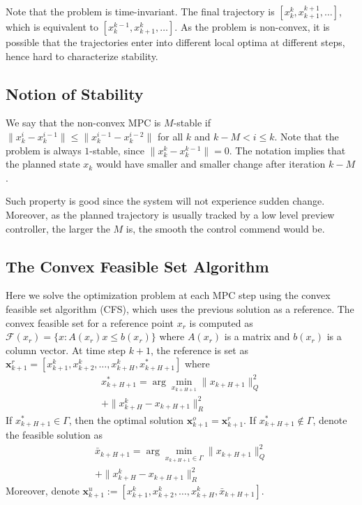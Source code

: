 \documentclass{ifacconf}
\begin{document}
Note that the problem is time-invariant. The final trajectory is $[x_k^k,x_{k+1}^{k+1},\ldots]$, which is equivalent to $[x_{k}^{k-1},x_{k+1}^{k},\ldots]$. As the problem is non-convex, it is possible that the trajectories enter into different local optima at different steps, hence hard to characterize stability. 

\subsection{Notion of Stability}
We say that the non-convex MPC is $M$-stable if $\|x_{k}^i-x_k^{i-1}\|\leq \|x_k^{i-1}-x_k^{i-2}\|$ for all $k$ and $k-M< i\leq k$. Note that the problem is always $1$-stable, since $\|x_{k}^k-x_k^{k-1}\|=0$. The notation implies that the planned state $x_k$ would have smaller and smaller change after iteration $k-M$.

Such property is good since the system will not experience sudden change. Moreover, as the planned trajectory is usually tracked by a low level preview controller, the larger the $M$ is, the smooth the control commend would be.


\subsection{The Convex Feasible Set Algorithm}
Here we solve the optimization problem at each MPC step using the convex feasible set algorithm (CFS), which uses the previous solution as a reference. The convex feasible set for a reference point $x_r$ is computed as $\mathcal{F}(x_r) = \{x:A(x_r)x\leq b(x_r)\}$ where $A(x_r)$ is a matrix and $b(x_r)$ is a column vector. 
At time step $k+1$, the reference is set as $\mathbf{x}_{k+1}^{r}=[x_{k+1}^{k},x_{k+2}^{k},\ldots,x_{k+H}^k, x_{k+H+1}^*]$ where
\begin{eqnarray}
x_{k+H+1}^* = \arg\min_{x_{k+H+1}} \|x_{k+H+1}\|_Q^2\\+\|x_{k+H}^k-x_{k+H+1}\|_R^2
\end{eqnarray}
If $x_{k+H+1}^*\in\Gamma$, then the optimal solution $\mathbf{x}_{k+1}^o = \mathbf{x}_{k+1}^r$.  If $x_{k+H+1}^*\notin\Gamma$, denote the feasible solution as 
\begin{eqnarray}
\bar{x}_{k+H+1} = \arg\min_{x_{k+H+1}\in\Gamma} \|x_{k+H+1}\|_Q^2\\+\|x_{k+H}^k-x_{k+H+1}\|_R^2
\end{eqnarray}
Moreover, denote $\mathbf{x}_{k+1}^{u}:=[x_{k+1}^{k},x_{k+2}^{k},\ldots,x_{k+H}^k, \bar x_{k+H+1}]$. 
\end{document}
